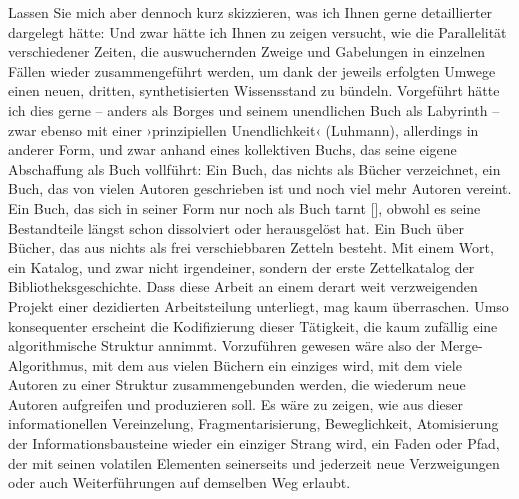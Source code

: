 \documentclass[a4paper,12pt]{article}
\newcommand{\inanf}[1]{›#1‹}
\newcommand{\anzeige}{\textbf{\color{hokkaido}\huge{\raisebox{-0.18ex}{$\bullet$}}\color{black}}}
\begin{document}
Lassen Sie mich aber dennoch kurz skizzieren, was ich Ihnen gerne detaillierter dargelegt hätte: Und zwar hätte ich Ihnen zu zeigen versucht, wie die Parallelität verschiedener Zeiten, die auswuchernden Zweige und Gabelungen in einzelnen Fällen wieder zusammengeführt werden, um dank der jeweils erfolgten Umwege einen neuen, dritten, synthetisierten Wissensstand zu bündeln. Vorgeführt hätte ich dies gerne – anders als Borges und seinem unendlichen Buch als Labyrinth – zwar ebenso mit einer \inanf{prinzipiellen Unendlichkeit} (Luhmann), allerdings in anderer Form, und zwar anhand eines kollektiven Buchs, das seine eigene Abschaffung als Buch vollführt: Ein Buch, das nichts als Bücher verzeichnet, ein Buch, das von vielen Autoren geschrieben ist und noch viel mehr Autoren vereint. Ein Buch, das sich in seiner Form nur noch als Buch tarnt [\anzeige], obwohl es seine Bestandteile längst schon dissolviert oder herausgelöst hat. Ein Buch über Bücher, das aus nichts als frei verschiebbaren Zetteln besteht. Mit einem Wort, ein Katalog, und zwar nicht irgendeiner, sondern der erste Zettelkatalog der Bibliotheksgeschichte. Dass diese Arbeit an einem derart weit verzweigenden Projekt einer dezidierten Arbeitsteilung unterliegt, mag kaum überraschen. Umso konsequenter erscheint die Kodifizierung dieser Tätigkeit, die kaum zufällig eine algorithmische Struktur annimmt. Vorzuführen gewesen wäre also der Merge-Algorithmus, mit dem aus vielen Büchern ein einziges wird, mit dem viele Autoren zu einer Struktur zusammengebunden werden, die wiederum neue Autoren aufgreifen und produzieren soll. Es wäre zu zeigen, wie aus dieser informationellen Vereinzelung, Fragmentarisierung, Beweglichkeit, Atomisierung der Informationsbausteine wieder ein einziger Strang wird, ein Faden oder Pfad, der mit seinen volatilen Elementen seinerseits und jederzeit neue Verzweigungen oder auch Weiterführungen auf demselben Weg erlaubt.
\end{document}
